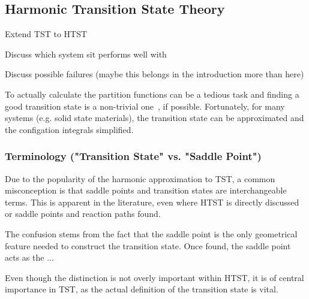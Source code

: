 \subsection{Harmonic Transition State Theory}
\label{sec:htst}


\bit
\item Extend TST to HTST
\item Discuss which system sit performs well with
\item Discuss possible failures (maybe this belongs in the introduction more than here)
\eit

To actually calculate the partition functions can be a tedious task and finding a good transition state is a non-trivial one~\citemiss, if possible.
Fortunately, for many systems (e.g. solid state materials), the transition state can be approximated and the configation integrals simplified.

\incomplete

\subsubsection{Terminology ("Transition State" vs. "Saddle Point")}
Due to the popularity of the harmonic approximation to TST, a common misconception is that saddle points and transition states are interchangeable terms.
This is apparent in the literature, even where HTST is directly discussed or saddle points and reaction paths found.

The confusion stems from the fact that the saddle point is the only geometrical feature needed to construct the transition state.
Once found, the saddle point acts as the ... 

Even though the distinction is not overly important within HTST, it is of central importance in TST, as the actual definition of the transition state is vital.

\recent

\incomplete
